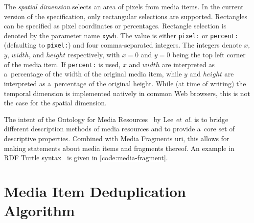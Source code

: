 \documentclass{article}
\begin{document}
The \emph{spatial dimension} selects an area of pixels from media items. In the current version of the specification, only rectangular selections are supported. Rectangles can be specified as pixel coordinates or percentages. Rectangle selection is denoted by the parameter name \texttt{xywh}. The value is either \texttt{pixel:} or \texttt{percent:} (defaulting to \texttt{pixel:}) and four comma-separated integers. The integers denote $x$, $y$, $width$, and $height$ respectively, with $x = 0$ and $y = 0$ being the top left corner of the media item. If \texttt{percent:} is used,\linebreak
$x$ and $width$ are interpreted as a~percentage of the width of the original media item, while $y$ and $height$ are interpreted as a~percentage of the original height.
While (at time of writing) the temporal dimension is implemented natively in common Web browsers, this is not the case for the spatial dimension.

The intent of the Ontology for Media Resources~\cite{lee2012mediaontology} by Lee \emph{et~al.} is to bridge different description methods of media resources
and to provide a~core set of descriptive properties. Combined with Media Fragments {\sc uri}, this allows for making statements about media items and fragments thereof. An example in RDF Turtle syntax~\cite{prudhommeaux2013turtle} is given in \autoref{code:media-fragment}.


\section{Media Item Deduplication Algorithm}
\label{sec:media-item-deduplication-algorithm}
\end{document}
